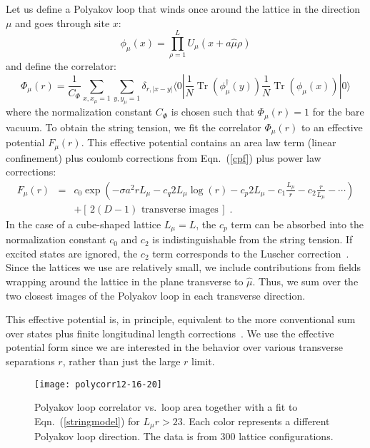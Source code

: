 \documentclass[preprint,aps,prd]{revtex4-2}
\newcommand{\be}{\begin{equation}}
\newcommand{\eq}{\end{equation}}
\DeclareMathOperator{\Tr}{Tr}
\begin{document}
Let us define a Polyakov loop that winds once around the lattice
in the direction $\mu$ and goes through site $x$:
\be
         \phi_\mu(x)= \prod_{\rho=1}^L U_\mu(x+a \hat{\mu} \rho)
\eq
and define the correlator:
\be
\Phi_\mu(r) = \frac{1}{C_\Phi} \sum_{x, x_\mu=1} \sum_{y, y_\mu=1}
           \delta_{r,|x-y|}
           \langle 0 | \frac{1}{N} \Tr\left(\phi_\mu^\dagger(y)\right)
           \frac{1}{N} \Tr\left(\phi_\mu(x)\right) |0\rangle
           \label{pcorr}
\eq
%
where the normalization constant $C_\Phi$ is chosen such that
$\Phi_\mu(r)=1$ for the bare vacuum.  To obtain the string tension,
we fit the correlator $\Phi_\mu(r)$ to an effective potential $F_\mu(r)$.
This effective potential contains an area law term (linear confinement)
plus coulomb corrections from Eqn.~(\ref{cpf}) plus power law corrections:
%
\begin{eqnarray}
         F_\mu(r) &=& c_0 \exp\left(
         -\sigma a^2 r L_\mu
         - c_q 2 L_\mu \log(r) - c_p 2 L_\mu
         - c_1 \frac{L_\mu}{r} - c_2 \frac{r}{L_\mu} - \cdots \right)\nonumber\\
         & & + \left[\,\mbox{$2 (D-1)$ transverse images}\,\right]
         \; .  \label{stringmodel}
\end{eqnarray}
%
In the case of
a cube-shaped lattice $L_\mu = L$, the $c_p$ term can be absorbed into
the normalization constant $c_0$ and $c_2$ is indistinguishable from
the string tension.  If excited states are ignored, the $c_2$ term corresponds
to the Luscher correction~\cite{teper_large_2009}.
Since the lattices we use are relatively small, we include contributions
from fields wrapping around the lattice in the plane transverse to
$\hat{\mu}$.  Thus, we sum over the two closest images of the Polyakov
loop in each transverse direction.

This effective potential is, in principle, equivalent to the more
conventional sum over states plus finite longitudinal length
corrections~\cite{teper_large_2009,aharony_effective_2013}.
We use the effective potential form since we are interested in
the behavior over various transverse separations $r$, rather than
just the large $r$ limit.

\begin{figure}
  \texttt{[image: polycorr12-16-20]}
  \caption{Polyakov loop correlator vs.\ loop area together with
    a fit to Eqn.~(\ref{stringmodel}) for $L_\mu r>23$.
    Each color represents a different Polyakov loop direction.
    The data is from 300 lattice configurations. \label{pcorr16}}
\end{figure}
\end{document}
